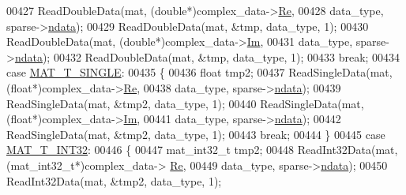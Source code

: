\begin{DoxyCode}
{00427                                 ReadDoubleData(mat, (\textcolor{keywordtype}{double}*)complex\_data->\hyperlink{group___m_a_t_a484a93607508adac2bce53a0252e0325}{Re},
00428                                     data\_type, sparse->\hyperlink{group___m_a_t_a1beb8a8c58a808207cbea650563a9b63}{ndata});
00429                                 ReadDoubleData(mat, &tmp, data\_type, 1);
00430                                 ReadDoubleData(mat, (\textcolor{keywordtype}{double}*)complex\_data->\hyperlink{group___m_a_t_a7182d10b0d3598415887376065440946}{Im},
00431                                     data\_type, sparse->\hyperlink{group___m_a_t_a1beb8a8c58a808207cbea650563a9b63}{ndata});
00432                                 ReadDoubleData(mat, &tmp, data\_type, 1);
00433                                 \textcolor{keywordflow}{break};
00434                             \textcolor{keywordflow}{case} \hyperlink{group___m_a_t_ggacf7b3b879282b7ab3a51190e49bf3453a3a3657d40e9212c923d9b9d03531b64c}{MAT\_T\_SINGLE}:
00435                             \{
00436                                 \textcolor{keywordtype}{float} tmp2;
00437                                 ReadSingleData(mat, (\textcolor{keywordtype}{float}*)complex\_data->\hyperlink{group___m_a_t_a484a93607508adac2bce53a0252e0325}{Re},
00438                                     data\_type, sparse->\hyperlink{group___m_a_t_a1beb8a8c58a808207cbea650563a9b63}{ndata});
00439                                 ReadSingleData(mat, &tmp2, data\_type, 1);
00440                                 ReadSingleData(mat, (\textcolor{keywordtype}{float}*)complex\_data->\hyperlink{group___m_a_t_a7182d10b0d3598415887376065440946}{Im},
00441                                     data\_type, sparse->\hyperlink{group___m_a_t_a1beb8a8c58a808207cbea650563a9b63}{ndata});
00442                                 ReadSingleData(mat, &tmp2, data\_type, 1);
00443                                 \textcolor{keywordflow}{break};
00444                             \}
00445                             \textcolor{keywordflow}{case} \hyperlink{group___m_a_t_ggacf7b3b879282b7ab3a51190e49bf3453a83e06a68320726c6572bfbb9f3addb1d}{MAT\_T\_INT32}:
00446                             \{
00447                                 mat\_int32\_t tmp2;
00448                                 ReadInt32Data(mat, (mat\_int32\_t*)complex\_data->
      \hyperlink{group___m_a_t_a484a93607508adac2bce53a0252e0325}{Re},
00449                                     data\_type, sparse->\hyperlink{group___m_a_t_a1beb8a8c58a808207cbea650563a9b63}{ndata});
00450                                 ReadInt32Data(mat, &tmp2, data\_type, 1);
}
\end{DoxyCode}
